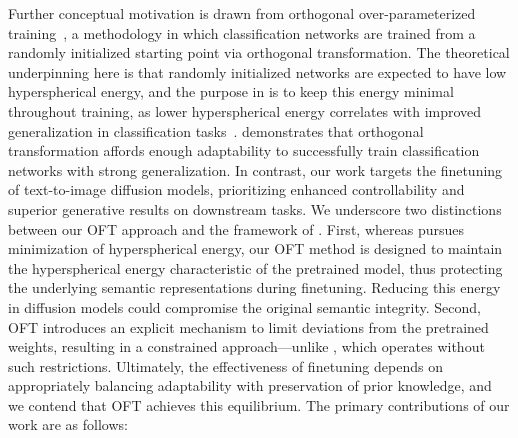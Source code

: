 Further conceptual motivation is drawn from orthogonal over-parameterized training~\cite{liu2021orthogonal}, a methodology in which classification networks are trained from a randomly initialized starting point via orthogonal transformation. The theoretical underpinning here is that randomly initialized networks are expected to have low hyperspherical energy, and the purpose in \cite{liu2021orthogonal} is to keep this energy minimal throughout training, as lower hyperspherical energy correlates with improved generalization in classification tasks~\cite{liu2018learning,lin2020regularizing}. \cite{liu2021orthogonal} demonstrates that orthogonal transformation affords enough adaptability to successfully train classification networks with strong generalization. In contrast, our work targets the finetuning of text-to-image diffusion models, prioritizing enhanced controllability and superior generative results on downstream tasks. We underscore two distinctions between our OFT approach and the framework of \cite{liu2021orthogonal}. First, whereas \cite{liu2021orthogonal} pursues minimization of hyperspherical energy, our OFT method is designed to maintain the hyperspherical energy characteristic of the pretrained model, thus protecting the underlying semantic representations during finetuning. Reducing this energy in diffusion models could compromise the original semantic integrity. Second, OFT introduces an explicit mechanism to limit deviations from the pretrained weights, resulting in a constrained approach—unlike \cite{liu2021orthogonal}, which operates without such restrictions. Ultimately, the effectiveness of finetuning depends on appropriately balancing adaptability with preservation of prior knowledge, and we contend that OFT achieves this equilibrium. The primary contributions of our work are as follows:

